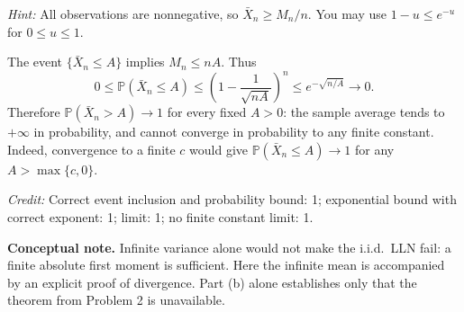 \documentclass[11pt,letterpaper]{article}
\newcommand{\Prob}{\mathbb P}
\newcommand{\credit}[1]{\par{\footnotesize\color{muted}\textit{Credit:} #1}}
\begin{document}
\begin{enumerate}
  \emph{Hint:} All observations are nonnegative, so
  $\bar X_n\ge M_n/n$. You may use $1-u\le e^{-u}$ for $0\le u\le1$.
  \begin{solution}[1.15in]
    The event $\{\bar X_n\le A\}$ implies $M_n\le nA$. Thus
    \[
      0\le\Prob(\bar X_n\le A)
      \le\left(1-\frac1{\sqrt{nA}}\right)^n
      \le e^{-\sqrt{n/A}}\longrightarrow0.
    \]
    Therefore $\Prob(\bar X_n>A)\to1$ for every fixed $A>0$:
    the sample average tends to $+\infty$ in probability, and cannot
    converge in probability to any finite constant. Indeed, convergence
    to a finite $c$ would give $\Prob(\bar X_n\le A)\to1$ for any
    $A>\max\{c,0\}$.
    \credit{Correct event inclusion and probability bound: 1;
    exponential bound with correct exponent: 1; limit: 1;
    no finite constant limit: 1.}
  \end{solution}
\end{enumerate}

\ifanswers
  {\footnotesize\color{muted}\textbf{Conceptual note.}
  Infinite variance alone would not make the i.i.d.\ LLN fail: a finite
  absolute first moment is sufficient. Here the infinite mean is accompanied
  by an explicit proof of divergence. Part (b) alone establishes only that
  the theorem from Problem 2 is unavailable.}
\fi

\label{quiz-last-page}
\end{document}
